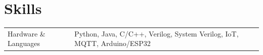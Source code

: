 \documentclass[a4paper,12pt]{article}
\begin{document}
\section{Skills}
\begin{tabularx}{\linewidth}{@{}l X@{}}
Hardware \& Languages &  \normalsize{Python, Java, C/C++, Verilog, System Verilog, IoT, MQTT, Arduino/ESP32}\\
\end{tabularx}

\vfill
{}
\end{document}

